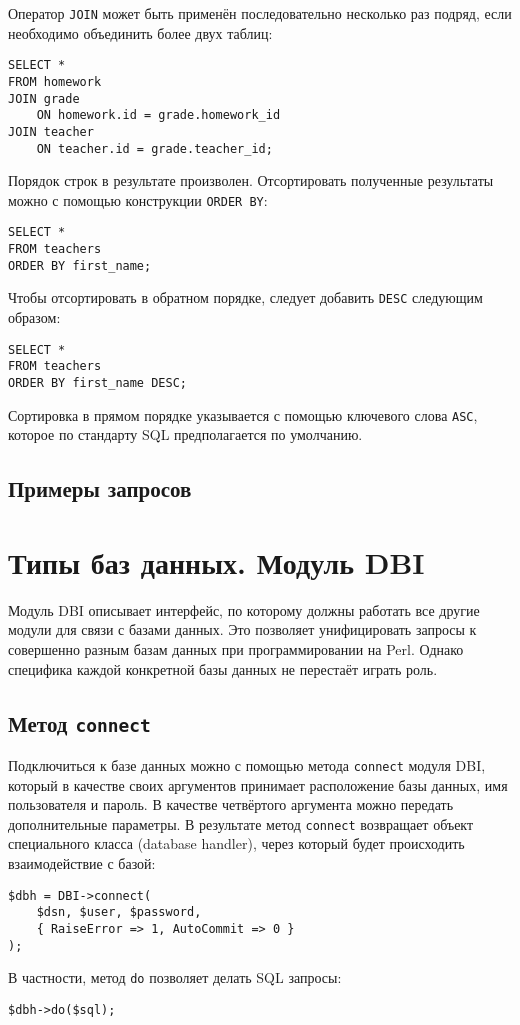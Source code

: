 Оператор \verb|JOIN| может быть применён последовательно несколько раз подряд, если необходимо объединить более двух таблиц:
\begin{verbatim}
SELECT *
FROM homework
JOIN grade
    ON homework.id = grade.homework_id
JOIN teacher
    ON teacher.id = grade.teacher_id;
\end{verbatim}


Порядок строк в результате произволен. Отсортировать полученные результаты можно с помощью конструкции \verb|ORDER BY|:
\begin{verbatim}
SELECT *
FROM teachers
ORDER BY first_name;
\end{verbatim}
Чтобы отсортировать в обратном порядке, следует добавить \verb|DESC| следующим образом:
\begin{verbatim}
SELECT *
FROM teachers
ORDER BY first_name DESC;
\end{verbatim}
Сортировка в прямом порядке указывается с помощью ключевого слова \verb|ASC|,
которое по стандарту SQL предполагается по умолчанию.
\subsection{Примеры запросов}

\section{Типы баз данных. Модуль DBI}

Модуль DBI описывает интерфейс, по которому должны работать все другие модули для связи с базами данных. Это позволяет унифицировать запросы к совершенно разным базам данных при программировании на Perl. Однако специфика каждой конкретной базы данных не перестаёт играть роль.

\subsection{Метод \texttt{connect}}
Подключиться к базе данных можно с помощью метода \verb|connect| модуля DBI, который в качестве своих аргументов принимает расположение базы данных, имя пользователя и пароль.
В качестве четвёртого аргумента можно передать дополнительные параметры.
В результате метод \verb|connect| возвращает объект специального класса (database handler),
через который будет происходить взаимодействие с базой:
\begin{verbatim}
$dbh = DBI->connect(
    $dsn, $user, $password,
    { RaiseError => 1, AutoCommit => 0 }
);
\end{verbatim}
В частности, метод \verb|do| позволяет делать SQL запросы:
\begin{verbatim}
$dbh->do($sql);
\end{verbatim}

